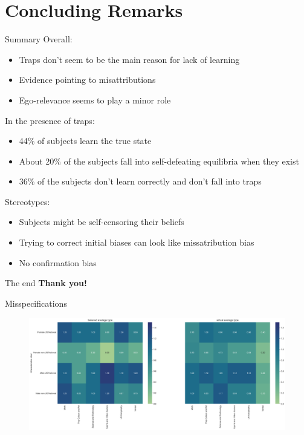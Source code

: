 \documentclass[aspectratio=169]{beamer}
\begin{document}
\section*{Concluding Remarks}

\begin{frame}{Summary}
Overall:\\
    \begin{itemize}
        \item Traps don't seem to be the main reason for lack of learning
        \item Evidence pointing to misattributions
        \item Ego-relevance seems to play a minor role
    \end{itemize}
    \bigskip
In the presence of traps:\\
    \begin{itemize}
        \item 44\% of subjects learn the true state
        \item About 20\% of the subjects fall into self-defeating equilibria when they exist
        \item 36\% of the subjects don't learn correctly and don't fall into traps
    \end{itemize} 
\bigskip
Stereotypes:\\
    \begin{itemize}
        \item Subjects might be self-censoring their beliefs
        \item Trying to correct initial biases can look like missatribution bias
        \item No confirmation bias
    \end{itemize}
\end{frame}


\begin{frame}{The end}
    \large\textbf{Thank you!}
\end{frame}

\appendix

\begin{frame}{Misspecifications}
    \label{misspecificationsheat}
    \begin{figure}
        \centering
        \includegraphics[scale=.3]{believed_actual_type_heat.png}
    \end{figure}
\end{frame}
\end{document}
